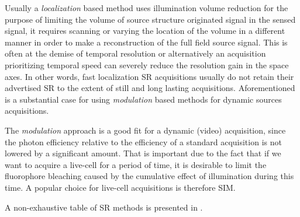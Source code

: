 Usually a \emph{localization} based method uses illumination volume reduction for the purpose of limiting the volume of
    source structure originated signal in the sensed signal, it requires scanning or varying the location of the volume
    in a different manner in order to make a reconstruction of the full field source signal.
This is often at the demise of temporal resolution or alternatively an acquisition prioritizing temporal speed can
    severely reduce the resolution gain in the space axes.
In other words, fast localization \ac{SR} acquisitions usually do not retain their advertised \ac{SR} to the extent of
    still and long lasting acquisitions.
Aforementioned is a substantial case for using \emph{modulation} based methods for dynamic sources acquisitions.

The \emph{modulation} approach is a good fit for a dynamic (video) acquisition, since the photon efficiency relative to
    the efficiency of a standard acquisition is not lowered by a significant amount.
That is important due to the fact that if we want to acquire a live-cell for a period of time, it is desirable to limit
    the fluorophore bleaching caused by the cumulative effect of illumination during this time.
A popular choice for live-cell acquisitions is therefore \ac{SIM}.

A non-exhaustive table of \ac{SR} methods is presented in .


